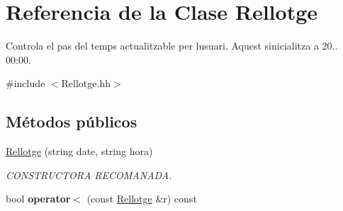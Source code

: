 \hypertarget{class_rellotge}{}\section{Referencia de la Clase Rellotge}
\label{class_rellotge}


Controla el pas del temps actualitzable per l\textquotesingle{}usuari. Aquest s\textquotesingle{}inicialitza a 20.. 00\+:00.  




{\ttfamily \#include $<$Rellotge.\+hh$>$}

\subsection*{Métodos públicos}
\begin{DoxyCompactItemize}
\item 
\hyperlink{class_rellotge_a32a5ede4b39b3dfc22a10d93a68d4173}{Rellotge} (string date, string hora)
\begin{DoxyCompactList}\small\item\em C\+O\+N\+S\+T\+R\+U\+C\+T\+O\+R\+A R\+E\+C\+O\+M\+A\+N\+A\+D\+A. \end{DoxyCompactList}\item 
\hypertarget{class_rellotge_aec4d03763b1bfed2821e2df4a3923b19}{}bool {\bfseries operator$<$} (const \hyperlink{class_rellotge}{Rellotge} \&r) const \label{class_rellotge_aec4d03763b1bfed2821e2df4a3923b19}


\end{DoxyCompactItemize}
